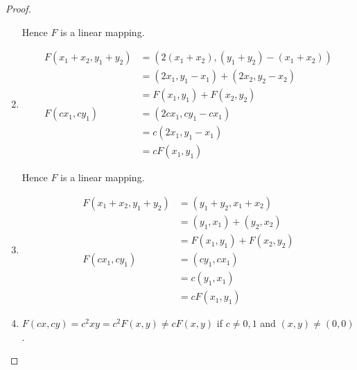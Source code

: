 \begin{proof}
\begin{enumerate}[label={(\alph*)}]
              Hence $F$ is a linear mapping.
        \item
              \begin{align*}
                  F(x_{1} + x_{2}, y_{1} + y_{2}) & = (2(x_{1} + x_{2}), (y_{1} + y_{2}) - (x_{1} + x_{2})) \\
                                                  & = (2x_{1}, y_{1} - x_{1}) + (2x_{2}, y_{2} - x_{2})     \\
                                                  & = F(x_{1}, y_{1}) + F(x_{2}, y_{2})                     \\
                  F(cx_{1}, cy_{1})               & = (2cx_{1}, cy_{1} - cx_{1})                            \\
                                                  & = c(2x_{1}, y_{1} - x_{1})                              \\
                                                  & = cF(x_{1}, y_{1})
              \end{align*}

              Hence $F$ is a linear mapping.

        \item
              \begin{align*}
                  F(x_{1} + x_{2}, y_{1} + y_{2}) & = (y_{1} + y_{2}, x_{1} + x_{2})    \\
                                                  & = (y_{1}, x_{1}) + (y_{2}, x_{2})   \\
                                                  & = F(x_{1}, y_{1}) + F(x_{2}, y_{2}) \\
                  F(cx_{1}, cy_{1})               & = (cy_{1}, cx_{1})                  \\
                                                  & = c(y_{1}, x_{1})                   \\
                                                  & = cF(x_{1}, y_{1})
              \end{align*}
        \item $F(cx, cy) = c^{2}xy = c^{2}F(x, y) \ne cF(x, y)$ if $c\ne 0, 1$ and $(x, y)\ne (0, 0)$.


\end{enumerate}
\end{proof}
